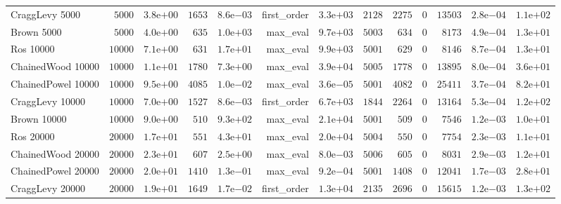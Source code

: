 \begin{longtable}[c]{lrrrrrrrrrrrr}
CraggLevy 5000 & \( 5000\) & \( 3.8\)e\(+00\) & \( 1653\) & \( 8.6\)e\(-03\) & first\_order & \( 3.3\)e\(+03\) & \( 2128\) & \( 2275\) & \(    0\) & \(13503\) & \( 2.8\)e\(-04\) & \( 1.1\)e\(+02\) \\
Brown 5000 & \( 5000\) & \( 4.0\)e\(+00\) & \(  635\) & \( 1.0\)e\(+03\) & max\_eval & \( 9.7\)e\(+03\) & \( 5003\) & \(  634\) & \(    0\) & \( 8173\) & \( 4.9\)e\(-04\) & \( 1.3\)e\(+01\) \\
Ros 10000 & \(10000\) & \( 7.1\)e\(+00\) & \(  631\) & \( 1.7\)e\(+01\) & max\_eval & \( 9.9\)e\(+03\) & \( 5001\) & \(  629\) & \(    0\) & \( 8146\) & \( 8.7\)e\(-04\) & \( 1.3\)e\(+01\) \\
ChainedWood 10000 & \(10000\) & \( 1.1\)e\(+01\) & \( 1780\) & \( 7.3\)e\(+00\) & max\_eval & \( 3.9\)e\(+04\) & \( 5005\) & \( 1778\) & \(    0\) & \(13895\) & \( 8.0\)e\(-04\) & \( 3.6\)e\(+01\) \\
ChainedPowel 10000 & \(10000\) & \( 9.5\)e\(+00\) & \( 4085\) & \( 1.0\)e\(-02\) & max\_eval & \( 3.6\)e\(-05\) & \( 5001\) & \( 4082\) & \(    0\) & \(25411\) & \( 3.7\)e\(-04\) & \( 8.2\)e\(+01\) \\
CraggLevy 10000 & \(10000\) & \( 7.0\)e\(+00\) & \( 1527\) & \( 8.6\)e\(-03\) & first\_order & \( 6.7\)e\(+03\) & \( 1844\) & \( 2264\) & \(    0\) & \(13164\) & \( 5.3\)e\(-04\) & \( 1.2\)e\(+02\) \\
Brown 10000 & \(10000\) & \( 9.0\)e\(+00\) & \(  510\) & \( 9.3\)e\(+02\) & max\_eval & \( 2.1\)e\(+04\) & \( 5001\) & \(  509\) & \(    0\) & \( 7546\) & \( 1.2\)e\(-03\) & \( 1.0\)e\(+01\) \\
Ros 20000 & \(20000\) & \( 1.7\)e\(+01\) & \(  551\) & \( 4.3\)e\(+01\) & max\_eval & \( 2.0\)e\(+04\) & \( 5004\) & \(  550\) & \(    0\) & \( 7754\) & \( 2.3\)e\(-03\) & \( 1.1\)e\(+01\) \\
ChainedWood 20000 & \(20000\) & \( 2.3\)e\(+01\) & \(  607\) & \( 2.5\)e\(+00\) & max\_eval & \( 8.0\)e\(-03\) & \( 5006\) & \(  605\) & \(    0\) & \( 8031\) & \( 2.9\)e\(-03\) & \( 1.2\)e\(+01\) \\
ChainedPowel 20000 & \(20000\) & \( 2.0\)e\(+01\) & \( 1410\) & \( 1.3\)e\(-01\) & max\_eval & \( 9.2\)e\(-04\) & \( 5001\) & \( 1408\) & \(    0\) & \(12041\) & \( 1.7\)e\(-03\) & \( 2.8\)e\(+01\) \\
CraggLevy 20000 & \(20000\) & \( 1.9\)e\(+01\) & \( 1649\) & \( 1.7\)e\(-02\) & first\_order & \( 1.3\)e\(+04\) & \( 2135\) & \( 2696\) & \(    0\) & \(15615\) & \( 1.2\)e\(-03\) & \( 1.3\)e\(+02\) \\

\end{longtable}
